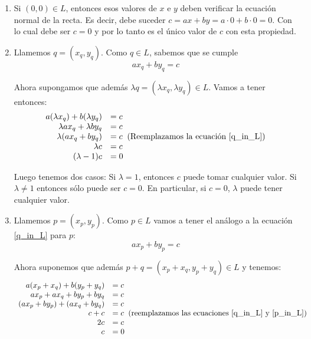 \begin{enumerate}[resume,topsep=6pt, itemsep=.4cm]
\rta 

\begin{enumerate}
 \item Si $(0,0) \in L$, entonces esos valores de $x$ e $y$ deben verificar la ecuación normal de la recta. Es decir, debe suceder $c = ax + by = a\cdot 0 + b \cdot 0 = 0$. Con lo cual debe ser $c=0$ y por lo tanto es el único valor de $c$ con esta propiedad.

 \item Llamemos $q=(x_q , y_q)$. Como $q \in L$, sabemos que se cumple 
\begin{equation}\label{q_in_L}
a x_q + b y_q = c
\end{equation} 

Ahora supongamos que además $ \lambda q = (\lambda x_q, \lambda y_q) \in L$. Vamos a tener entonces:
\begin{equation*}
\begin{array}{rl}
a (\lambda x_q ) + b (\lambda y_q) &= c \\
\lambda a x_q  + \lambda b y_q &= c \\
\lambda ( a x_q  + b y_q ) &= c \; \; \text{(Reemplazamos la ecuación \ref{q_in_L})}\\
\lambda c &= c \\
(\lambda -1 ) c &= 0
\end{array}
\end{equation*}

Luego tenemos dos casos: Si $\lambda = 1$, entonces $c$ puede tomar cualquier valor. Si $\lambda \neq 1$ entonces sólo puede ser $c=0$. En particular, si $c=0$, $\lambda$ puede tener cualquier valor.
 
 \item Llamemos $p=(x_p,y_p)$. Como $p \in L$ vamos a tener el análogo a la ecuación \ref{q_in_L} para $p$:
\begin{equation}\label{p_in_L}
a x_p + b y_p = c
\end{equation} 

Ahora suponemos que además $p+q = (x_p + x_q,y_p + y_q) \in L$ y tenemos:
\begin{equation*}
\begin{array}{rl}
a (x_p + x_q ) + b (y_p + y_q) &= c \\
a x_p + a x_q + b y_p + b y_q &= c \\
(a x_p + b y_p) + (a x_q + b y_q) &= c \\
c + c &= c \; \; \text{(reemplazamos las ecuaciones \ref{q_in_L} y \ref{p_in_L})}\\
2 c &= c \\
c &= 0
\end{array}
\end{equation*}


\end{enumerate}
\end{enumerate}
